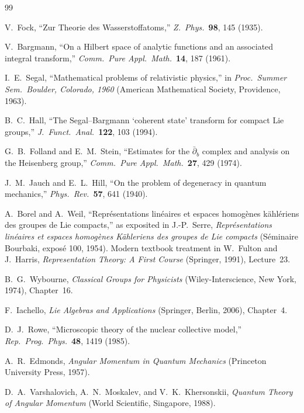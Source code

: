 \documentclass[twocolumn,pra,amsmath,amssymb,superscriptaddress]{revtex4-2}
\begin{document}
\begin{thebibliography}{99}

V.~Fock,
``Zur Theorie des Wasserstoffatoms,''
\textit{Z.\ Phys.}\ \textbf{98}, 145 (1935).

V.~Bargmann,
``On a Hilbert space of analytic functions and an associated
integral transform,''
\textit{Comm.\ Pure Appl.\ Math.}\ \textbf{14}, 187 (1961).

I.~E.\ Segal,
``Mathematical problems of relativistic physics,''
in \textit{Proc.\ Summer Sem.\ Boulder, Colorado, 1960}
(American Mathematical Society, Providence, 1963).

B.~C.\ Hall,
``The Segal--Bargmann `coherent state' transform for compact Lie
groups,''
\textit{J.\ Funct.\ Anal.}\ \textbf{122}, 103 (1994).

G.~B.\ Folland and E.~M.\ Stein,
``Estimates for the $\bar{\partial}_b$ complex and analysis on the
Heisenberg group,''
\textit{Comm.\ Pure Appl.\ Math.}\ \textbf{27}, 429 (1974).

J.~M.\ Jauch and E.~L.\ Hill,
``On the problem of degeneracy in quantum mechanics,''
\textit{Phys.\ Rev.}\ \textbf{57}, 641 (1940).

A.~Borel and A.~Weil, ``Repr\'esentations lin\'eaires et espaces
homog\`enes k\"ahl\'eriens des groupes de Lie compacts,'' as
exposited in J.-P.\ Serre, \textit{Repr\'esentations lin\'eaires et
espaces homog\`enes K\"ahleriens des groupes de Lie compacts}
(S\'eminaire Bourbaki, expos\'e 100, 1954).  Modern textbook
treatment in W.~Fulton and J.~Harris,
\textit{Representation Theory: A First Course} (Springer, 1991),
Lecture~23.

B.~G.\ Wybourne,
\textit{Classical Groups for Physicists}
(Wiley-Interscience, New York, 1974), Chapter~16.

F.~Iachello,
\textit{Lie Algebras and Applications}
(Springer, Berlin, 2006), Chapter~4.

D.~J.\ Rowe,
``Microscopic theory of the nuclear collective model,''
\textit{Rep.\ Prog.\ Phys.}\ \textbf{48}, 1419 (1985).

A.~R.\ Edmonds,
\textit{Angular Momentum in Quantum Mechanics}
(Princeton University Press, 1957).

D.~A.\ Varshalovich, A.~N.\ Moskalev, and V.~K.\ Khersonskii,
\textit{Quantum Theory of Angular Momentum}
(World Scientific, Singapore, 1988).


\end{thebibliography}
\end{document}
